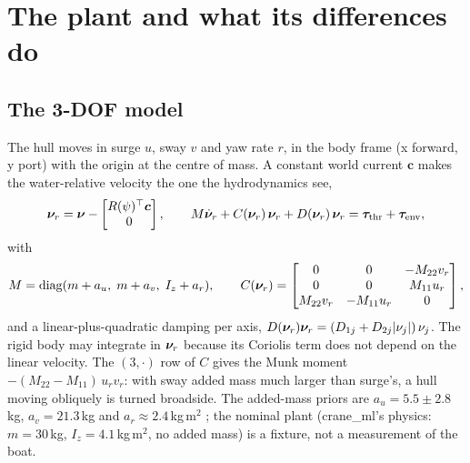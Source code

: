 \section{The plant and what its differences do}
\label{sec:plant}

\subsection{The 3-DOF model}
The hull moves in surge $u$, sway $v$ and yaw rate $r$, in the body frame (x forward, y
port) with the origin at the centre of mass. A constant world current $\bm c$ makes the
water-relative velocity the one the hydrodynamics see,
\[
  \bm{\nu}_r = \bm{\nu} - \begin{bmatrix} R(\psi)^\top \bm c \\ 0 \end{bmatrix},
  \qquad
  M\dot{\bm{\nu}}_r + C(\bm{\nu}_r)\,\bm{\nu}_r + D(\bm{\nu}_r)\,\bm{\nu}_r = \bm\tau_\text{thr} + \bm\tau_\text{env},
\]
with
\[
  M = \operatorname{diag}(m + a_u,\; m + a_v,\; I_z + a_r),\qquad
  C(\bm{\nu}_r) = \begin{bmatrix} 0 & 0 & -M_{22} v_r \\ 0 & 0 & M_{11} u_r \\ M_{22} v_r & -M_{11} u_r & 0 \end{bmatrix},
\]
and a linear-plus-quadratic damping per axis, $D(\bm{\nu}_r)\bm{\nu}_r = (D_{1j} + D_{2j}|\nu_j|)\,\nu_j$.
The rigid body may integrate in $\bm{\nu}_r$ because its Coriolis term does not depend on the
linear velocity. The $(3,\cdot)$ row of $C$ gives the Munk moment $-(M_{22}-M_{11})\,u_r v_r$:
with sway added mass much larger than surge's, a hull moving obliquely is turned broadside.
The added-mass priors are $a_u = 5.5 \pm 2.8$\,kg, $a_v = 21.3$\,kg and $a_r \approx 2.4$\,kg\,m$^2$
; the nominal plant (crane\_ml's physics: $m = 30$\,kg, $I_z = 4.1$\,kg\,m$^2$,
no added mass) is a fixture, not a measurement of the boat.

